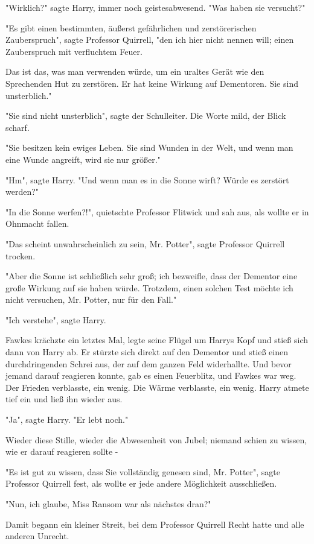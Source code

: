 {"Wirklich?" sagte Harry, immer noch geistesabwesend. "Was haben sie versucht?"

"Es gibt einen bestimmten, äußerst gefährlichen und zerstörerischen Zauberspruch", sagte Professor Quirrell, "den ich hier nicht nennen will; einen Zauberspruch mit verfluchtem Feuer.

Das ist das, was man verwenden würde, um ein uraltes Gerät wie den Sprechenden Hut zu zerstören. Er hat keine Wirkung auf Dementoren. Sie sind unsterblich."

"Sie sind nicht unsterblich", sagte der Schulleiter. Die Worte mild, der Blick scharf.

"Sie besitzen kein ewiges Leben. Sie sind Wunden in der Welt, und wenn man eine Wunde angreift, wird sie nur größer."

"Hm", sagte Harry. "Und wenn man es in die Sonne wirft? Würde es zerstört werden?"

"In die Sonne werfen?!", quietschte Professor Flitwick und sah aus, als wollte er in Ohnmacht fallen.

"Das scheint unwahrscheinlich zu sein, Mr. Potter", sagte Professor Quirrell trocken.

"Aber die Sonne ist schließlich sehr groß; ich bezweifle, dass der Dementor eine große Wirkung auf sie haben würde. Trotzdem, einen solchen Test möchte ich nicht versuchen, Mr. Potter, nur für den Fall."

"Ich verstehe", sagte Harry.

Fawkes krächzte ein letztes Mal, legte seine Flügel um Harrys Kopf und stieß sich dann von Harry ab. Er stürzte sich direkt auf den Dementor und stieß einen durchdringenden Schrei aus, der auf dem ganzen Feld widerhallte. Und bevor jemand darauf reagieren konnte, gab es einen Feuerblitz, und Fawkes war weg. Der Frieden verblasste, ein wenig. Die Wärme verblasste, ein wenig. Harry atmete tief ein und ließ ihn wieder aus.

"Ja", sagte Harry. "Er lebt noch."

Wieder diese Stille, wieder die Abwesenheit von Jubel; niemand schien zu wissen, wie er darauf reagieren sollte -

"Es ist gut zu wissen, dass Sie vollständig genesen sind, Mr. Potter", sagte Professor Quirrell fest, als wollte er jede andere Möglichkeit ausschließen.

"Nun, ich glaube, Miss Ransom war als nächstes dran?"

Damit begann ein kleiner Streit, bei dem Professor Quirrell Recht hatte und alle anderen Unrecht.

}
